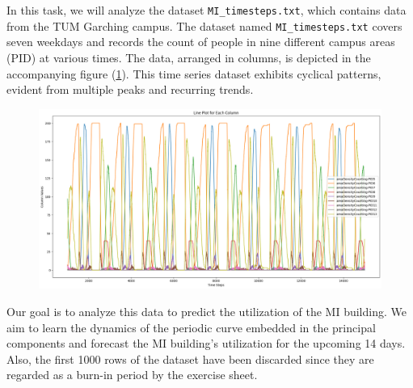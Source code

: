 In this task, we will analyze the dataset \texttt{MI\_timesteps.txt}, which contains data from the TUM Garching campus. The dataset named \texttt{MI\_timesteps.txt} covers seven weekdays and records the count of people in nine different campus areas (PID) at various times. The data, arranged in columns, is depicted in the accompanying figure (\ref{task5_1}). This time series dataset exhibits cyclical patterns, evident from multiple peaks and recurring trends.
\begin{figure}[H]
    \centering
    \includegraphics[width=0.8\linewidth]{images/task5_1_1.png}
    \caption{}
    \label{task5_1}
\end{figure}

Our goal is to analyze this data to predict the utilization of the MI building. We aim to learn the dynamics of the periodic curve embedded in the principal components and forecast the MI building's utilization for the upcoming 14 days. Also, the first 1000 rows of the dataset have been discarded since they are regarded as a burn-in period by the exercise sheet.\\

